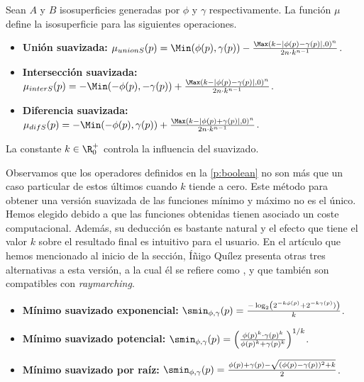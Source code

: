 
\begin{definicion}
    Sean $A$ y $B$ isosuperficies generadas por $\phi$ y $\gamma$ respectivamente. La función $\mu$ define la isosuperficie para las siguientes operaciones.
    \begin{itemize}
        \item \textbf{Unión suavizada: } $\mu_{unionS}(p) = \Min(\phi(p),\gamma(p)) - \frac{\Max\left( k - |\phi(p) - \gamma(p)|, 0\right)^n}{2n\cdot k^{n-1}}$.
        \item \textbf{Intersección suavizada: } $\mu_{interS}(p) = -\Min(-\phi(p),-\gamma(p)) + \frac{\Max\left( k - |\phi(p) - \gamma(p)|, 0\right)^n}{2n\cdot k^{n-1}}$.
        \item \textbf{Diferencia suavizada: } $\mu_{difS}(p) = -\Min(-\phi(p),\gamma(p)) + \frac{\Max\left( k - |\phi(p) + \gamma(p)|, 0\right)^n}{2n\cdot k^{n-1}}$.
    \end{itemize}
    La constante $k\in \R^+_0$ controla la influencia del suavizado.        
\end{definicion}

Observamos que los operadores definidos en la \autoref{p:boolean} no son más que un caso particular de estos últimos cuando $k$ tiende a cero. Este método para obtener una versión suavizada de las funciones mínimo y máximo no es el único. Hemos elegido debido a que las funciones obtenidas tienen asociado un coste computacional. Además, su deducción es bastante natural y el efecto que tiene el valor $k$ sobre el resultado final es intuitivo para el usuario. En el artículo que hemos mencionado al inicio de la sección, Íñigo Quílez \cite{article:smooth} presenta otras tres alternativas a esta versión, a la cual él se refiere como , y que también son compatibles con \textit{raymarching}.
\begin{itemize}
    \item \textbf{Mínimo suavizado exponencial:} $\smin_{\phi,\gamma}(p) = \frac{-\log_2\left( 2^{-k\phi(p)} + 2^{-k\gamma(p)} ) \right)}{k}$.
    \item \textbf{Mínimo suavizado potencial:} $\smin_{\phi,\gamma}(p) = \left(\frac{\phi(p)^k \cdot \gamma(p)^k}{\phi(p)^k + \gamma(p)^k}\right)^{1/k}$.
    \item \textbf{Mínimo suavizado por raíz:} $\smin_{\phi,\gamma}(p) = \frac{\phi(p) + \gamma(p) - \sqrt{(\phi(p)-\gamma(p))^2+k}}{2}$.
\end{itemize}

